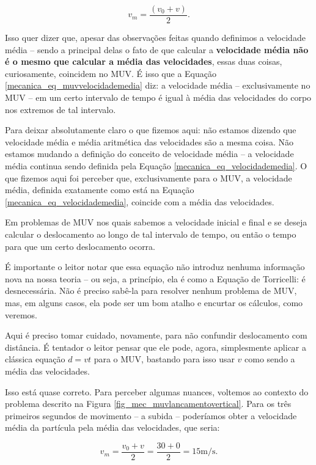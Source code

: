 $$ v_m =  \dfrac{(v_0+v)}{2}.$$

Isso quer dizer que, apesar das observações feitas quando definimos a velocidade média -- sendo a principal delas o fato de que calcular a \textbf{velocidade média não é o mesmo que calcular a média das velocidades}, essas duas coisas, curiosamente, coincidem no MUV. É isso que a Equação \eqref{mecanica_eq_muvvelocidademedia} diz: a velocidade média -- exclusivamente no MUV -- em um certo intervalo de tempo é igual à média das velocidades do corpo nos extremos de tal intervalo.

Para deixar absolutamente claro o que fizemos aqui: não estamos dizendo que velocidade média e média aritmética das velocidades são a mesma coisa. Não estamos mudando a definição do conceito de velocidade média -- a velocidade média continua sendo definida pela Equação \eqref{mecanica_eq_velocidademedia}. O que fizemos aqui foi perceber que, exclusivamente para o MUV, a velocidade média, definida exatamente como está na Equação \eqref{mecanica_eq_velocidademedia}, coincide com a média das velocidades.


Em problemas de MUV nos quais sabemos a velocidade inicial e final e se deseja calcular o deslocamento ao longo de tal intervalo de tempo, ou então o tempo para que um certo deslocamento ocorra.

É importante o leitor notar que essa equação não introduz nenhuma informação nova na nossa teoria -- ou seja, a princípio, ela é como a Equação de Torricelli: é desnecessária. Não é preciso sabê-la para resolver nenhum problema de MUV, mas, em alguns casos, ela pode ser um bom atalho e encurtar os cálculos, como veremos.



Aqui é preciso tomar cuidado, novamente, para não confundir deslocamento com distância. É tentador o leitor pensar que ele pode, agora, simplesmente aplicar a clássica equação $d=vt$ para o MUV, bastando para isso usar $v$ como sendo a média das velocidades. 

Isso está quase correto. Para perceber algumas nuances, voltemos ao contexto do problema descrito na Figura \ref{fig_mec_muvlancamentovertical}. Para os três primeiros segundos de movimento -- a subida -- poderíamos obter a velocidade média da partícula pela média das velocidades, que seria:

$$ v_m=\dfrac{v_0+v}{2}=\dfrac{30+0}{2}=15 \text{m/s}.$$

